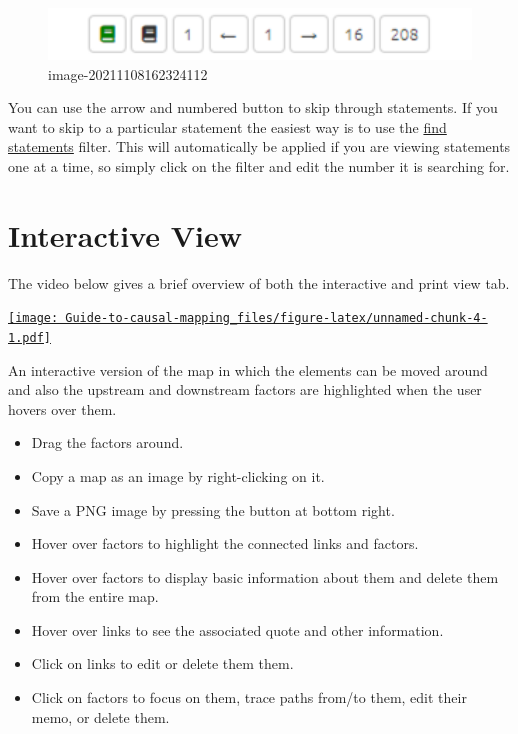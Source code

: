 \documentclass[
]{book}
\providecommand{\tightlist}{%
  \setlength{\itemsep}{0pt}\setlength{\parskip}{0pt}}
\begin{document}
\begin{figure}
\centering
\includegraphics[width=6.77083in,height=\textheight]{_assets/image-20211108162324112.png}
\caption{image-20211108162324112}
\end{figure}

You can use the arrow and numbered button to skip through statements. If you want to skip to a particular statement the easiest way is to use the \href{xfind-statements-links}{find statements} filter. This will automatically be applied if you are viewing statements one at a time, so simply click on the filter and edit the number it is searching for.

\hypertarget{xinteractive-view}{%
\chapter{Interactive View}\label{xinteractive-view}}

The video below gives a brief overview of both the interactive and print view tab.

\href{https://player.vimeo.com/video/674383670}{\texttt{[image: Guide-to-causal-mapping\_files/figure-latex/unnamed-chunk-4-1.pdf]}}

An interactive version of the map in which the elements can be moved around and also the upstream and downstream factors are highlighted when the user hovers over them.

\begin{itemize}
\tightlist
\item
  Drag the factors around.
\item
  Copy a map as an image by right-clicking on it.
\item
  Save a PNG image by pressing the button at bottom right.
\item
  Hover over factors to highlight the connected links and factors.
\item
  Hover over factors to display basic information about them and delete them from the entire map.
\item
  Hover over links to see the associated quote and other information.
\item
  Click on links to edit or delete them them.
\item
  Click on factors to focus on them, trace paths from/to them, edit their memo, or delete them.
\end{itemize}
\end{document}
